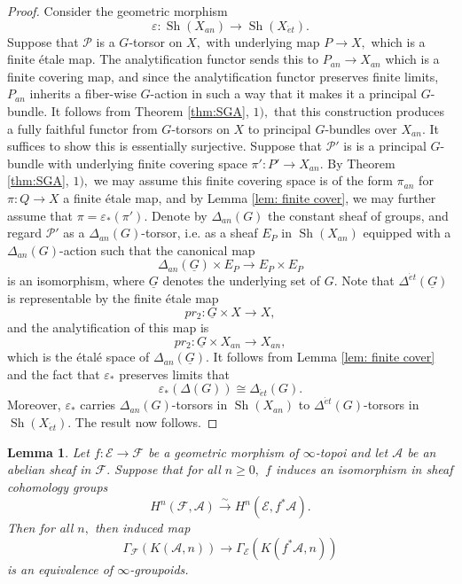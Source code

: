 \documentclass[12pt]{amsart}
\newtheorem{lemma}[dummy]{Lemma}
\theoremstyle{definition}
\newcommand{\cA}{\mathcal{A}}
\newcommand{\cE}{\mathcal{E}}
\newcommand{\cF}{\mathcal{F}}
\newcommand{\cP}{\mathcal{P}}
\newcommand{\Sh}{\operatorname{Sh}}
\newcommand{\et}{\acute{e}t}
\renewcommand{\i}{\infty}
\begin{document}
\begin{proof}
Consider the geometric morphism $$\varepsilon:\Sh\left(X_{an}\right) \to \Sh\left(X_{\et}\right).$$ Suppose that $\cP$ is a $G$-torsor on $X,$ with underlying map $P \to X,$ which is a finite \'etale map. The analytification functor sends this to $P_{an} \to X_{an}$ which is a finite covering map, and since the analytification functor preserves finite limits, $P_{an}$ inherits a fiber-wise $G$-action in such a way that it makes it a principal $G$-bundle. It follows from Theorem \ref{thm:SGA}, $1),$ that this construction produces a fully faithful functor from $G$-torsors on $X$ to principal $G$-bundles over $X_{an}.$ It suffices to show this is essentially surjective. Suppose that $\cP'$ is  is a principal $G$-bundle with underlying finite covering space $\pi':P' \to X_{an}.$ By Theorem \ref{thm:SGA}, $1),$ we may assume this finite covering space is of the form $\pi_{an}$ for $\pi:Q \to X$ a finite \'etale map, and by Lemma \ref{lem: finite cover}, we may further assume that  $\pi=\varepsilon_*\left(\pi'\right).$ Denote by $\Delta_{an}\left(G\right)$ the constant sheaf of groups, and regard $\cP'$ as a $\Delta_{an}\left(G\right)$-torsor, i.e. as a sheaf $E_P$ in $\Sh\left(X_{an}\right)$ equipped with a $\Delta_{an}\left(G\right)$-action such that the canonical map $$\Delta_{an}\left(\underline{G}\right) \times E_P \to E_P \times E_P$$ is an isomorphism, where  $\underline{G}$ denotes the underlying set of $G.$ Note that $\Delta^{\et}\left(\underline{G}\right)$ is representable by the finite \'etale map $$pr_2:\underline{G} \times X \to X,$$ and the analytification of this map is $$pr_2:\underline{G} \times X_{an} \to X_{an},$$ which is the \'etal\'e space of $\Delta_{an}\left(\underline{G}\right).$ It follows from Lemma \ref{lem: finite cover} and the fact that $\varepsilon_*$ preserves limits that $$\varepsilon_*\left(\Delta\left(G\right)\right)\cong\Delta_{\et}\left(G\right).$$ Moreover, $\varepsilon_*$ carries $\Delta_{an}\left(G\right)$-torsors in $\Sh\left(X_{an}\right)$ to $\Delta^{\et}\left(G\right)$-torsors in $\Sh\left(X_{\et}\right).$ The result now follows.
\end{proof}

\begin{lemma}\label{lem: K(A,n)}
Let $f:\cE \to \cF$ be a geometric morphism of $\i$-topoi and let $\cA$ be an abelian sheaf in $\cF.$ Suppose that for all $n \ge 0,$ $f$ induces an isomorphism in sheaf cohomology groups
$$H^n\left(\cF,\cA\right) \stackrel{\sim}{\longrightarrow} H^n\left(\cE,f^*\cA\right).$$
Then for all $n,$ then induced map $$\Gamma_{\cF}\left(K\left(\cA,n\right)\right) \to \Gamma_{\cE}\left(K\left(f^*\cA,n\right)\right)$$ is an equivalence of $\i$-groupoids.
\end{lemma}
\end{document}
